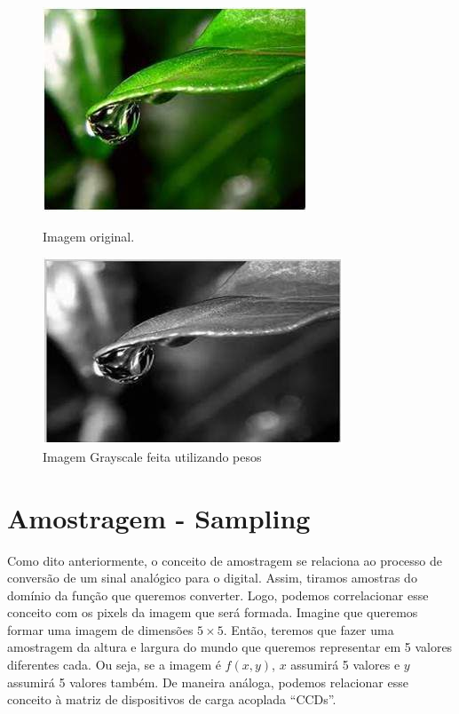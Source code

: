 \documentclass[a4paper, 12pt]{article}
\begin{document}
\begin{figure}[!htb]
	\centering
	  \includegraphics[width=\linewidth]{images/rgb.jpg}
	  \caption{Imagem original.}
	\endminipage\hspace{1cm}
	  \includegraphics[width=\linewidth]{images/weighted_gray.jpg}
	  \caption{Imagem Grayscale feita utilizando pesos}
	\endminipage
\end{figure}


\section{Amostragem - Sampling}

Como dito anteriormente, o conceito de amostragem se relaciona ao processo de conversão de um sinal analógico para o digital. Assim, 
tiramos amostras do domínio da função que queremos converter. Logo, podemos correlacionar esse conceito com os pixels da imagem que será formada.
Imagine que queremos formar uma imagem de dimensões $5 \times 5$. Então, teremos que fazer uma amostragem da altura e largura do mundo que queremos representar 
em 5 valores diferentes cada. Ou seja, se a imagem é $f(x, y)$, $x$ assumirá 5 valores e $y$ assumirá 5 valores também. De maneira análoga, podemos 
relacionar esse conceito à matriz de dispositivos de carga acoplada ``CCDs''.
\end{document}
